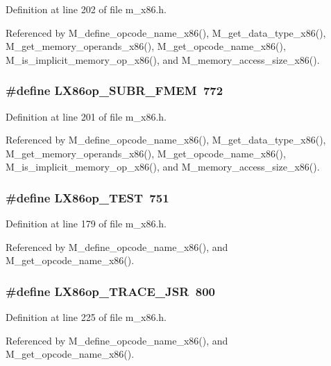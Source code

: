 Definition at line 202 of file m\_\-x86.h.

Referenced by M\_\-define\_\-opcode\_\-name\_\-x86(), M\_\-get\_\-data\_\-type\_\-x86(), M\_\-get\_\-memory\_\-operands\_\-x86(), M\_\-get\_\-opcode\_\-name\_\-x86(), M\_\-is\_\-implicit\_\-memory\_\-op\_\-x86(), and M\_\-memory\_\-access\_\-size\_\-x86().
\subsubsection{\setlength{\rightskip}{0pt plus 5cm}\#define LX86op\_\-SUBR\_\-FMEM~772}\label{m__x86_8h_66df06f90adcc2b63cbdb36be5cd4fe6}




Definition at line 201 of file m\_\-x86.h.

Referenced by M\_\-define\_\-opcode\_\-name\_\-x86(), M\_\-get\_\-data\_\-type\_\-x86(), M\_\-get\_\-memory\_\-operands\_\-x86(), M\_\-get\_\-opcode\_\-name\_\-x86(), M\_\-is\_\-implicit\_\-memory\_\-op\_\-x86(), and M\_\-memory\_\-access\_\-size\_\-x86().
\subsubsection{\setlength{\rightskip}{0pt plus 5cm}\#define LX86op\_\-TEST~751}\label{m__x86_8h_aca0cf81768aac25fea27a3d4286f7e9}




Definition at line 179 of file m\_\-x86.h.

Referenced by M\_\-define\_\-opcode\_\-name\_\-x86(), and M\_\-get\_\-opcode\_\-name\_\-x86().
\subsubsection{\setlength{\rightskip}{0pt plus 5cm}\#define LX86op\_\-TRACE\_\-JSR~800}\label{m__x86_8h_5b4e9d315c39645f640f183dad5420cf}




Definition at line 225 of file m\_\-x86.h.

Referenced by M\_\-define\_\-opcode\_\-name\_\-x86(), and M\_\-get\_\-opcode\_\-name\_\-x86().

